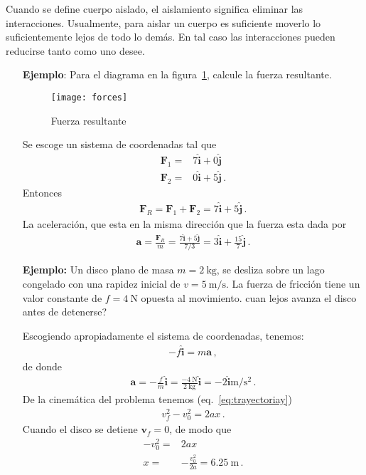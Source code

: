 \begin{borrar}
Cuando se define cuerpo aislado, el aislamiento significa eliminar las interacciones. Usualmente, para aislar un cuerpo es suficiente moverlo lo suficientemente lejos de todo lo dem\'as. En tal caso las interacciones pueden reducirse tanto como uno desee.
  
\end{borrar}


\begin{itemize}
\item[\textbf{Ejemplo}:] Para el diagrama en la figura~\ref{fig:forces}, calcule la fuerza resultante.
  \begin{figure}
    \centering
    \texttt{[image: forces]}
    \caption{Fuerza resultante}
    \label{fig:forces}
  \end{figure}

Se escoge un sistema de coordenadas tal que
\begin{align}
  \mathbf{F}_1=&7\hat{\mathbf{i}}+0\hat{\mathbf{j}}\nonumber\\
  \mathbf{F}_2=&0\hat{\mathbf{i}}+5\hat{\mathbf{j}}\,.
\end{align}
Entonces
\begin{align}
  \mathbf{F}_R=\mathbf{F}_1+\mathbf{F}_2=
  7\hat{\mathbf{i}}+5\hat{\mathbf{j}}\,.
\end{align}
La aceleraci\'on, que esta en la misma direcci\'on que la fuerza esta dada por
\begin{align}
  \mathbf{a}=\frac{\mathbf{F}_R}{m}=\frac{7\hat{\mathbf{i}}+5\hat{\mathbf{j}}}{7/3}=3\hat{\mathbf{i}}+\frac{15}{7}\hat{\mathbf{j}}\,.
\end{align}

\item[\textbf{Ejemplo:}] Un disco plano de masa $m=\SI{2}{\kilo\gram}$, se desliza sobre un lago congelado con una rapidez inicial de $v=\SI{5}{\meter\per\second}$. La fuerza de fricci\'on tiene un valor constante de $f=\SI{4}{\newton}$ opuesta al movimiento. \textquestiondown cuan lejos avanza el disco antes de detenerse?

Escogiendo apropiadamente el sistema de coordenadas, tenemos:
\begin{align}
  -f \hat{\mathbf{i}}=m\mathbf{a}\,,
\end{align}
de donde
\begin{align}
  \mathbf{a}=-\frac{f}{m}\hat{\mathbf{i}}=\frac{-\SI{4}{\newton}}{\SI{2}{\kilo\gram}}\hat{\mathbf{i}}={-2\hat{\mathbf{i}}}{\si{\meter\per\second\squared}}\,.
\end{align}
De la cinemática del problema tenemos (eq.~\eqref{eq:trayectoriay})
\begin{align}
  v_f^2-v_0^2=2 a x\,.
\end{align}
Cuando el disco se detiene $\mathbf{v}_f=0$, de modo que
\begin{align}
  -v_0^2=&2ax\nonumber\\
  x=&-\frac{v_0^2}{2a}=\SI{6.25}{\meter}\,.
\end{align}


\end{itemize}

